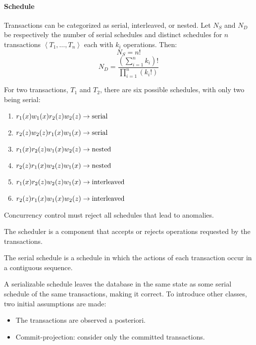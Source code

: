 \paragraph*{Schedule}
Transactions can be categorized as serial, interleaved, or nested. 
Let $N_S$ and $N_D$ be respectively the number of serial schedules and distinct schedules for $n$ transactions $\left\langle T_1,\dots,T_n\right\rangle $ each with $k_i$ operations. 
Then:
\[N_S=n!\]
\[N_D=\dfrac{\left( \sum_{i=1}^nk_i \right)!}{\prod_{i=1}^n \left( k_i! \right)}\]
\begin{example}
    For two transactions, $T_1$ and $T_2$, there are six possible schedules, with only two being serial:
    \begin{enumerate}
        \item $r_1(x) w_1(x) r_2(z) w_2(z) \rightarrow \textnormal{serial}$
        \item $r_2(z) w_2(z) r_1(x) w_1(x) \rightarrow \textnormal{serial}$
        \item $r_1(x) r_2(z) w_1(x) w_2(z) \rightarrow \textnormal{nested}$
        \item $r_2(z) r_1(x) w_2(z) w_1(x) \rightarrow \textnormal{nested}$
        \item $r_1(x) r_2(z) w_2(z) w_1(x) \rightarrow \textnormal{interleaved}$
        \item $r_2(z) r_1(x) w_1(x) w_2(z) \rightarrow \textnormal{interleaved}$
    \end{enumerate}
\end{example}
Concurrency control must reject all schedules that lead to anomalies.
\begin{definition}
    The scheduler is a component that accepts or rejects operations requested by the transactions. 
\end{definition}
\begin{definition}
    The serial schedule is a schedule in which the actions of each transaction occur in a contiguous sequence.
\end{definition}
A serializable schedule leaves the database in the same state as some serial schedule of the same transactions, making it correct. 
To introduce other classes, two initial assumptions are made:
\begin{itemize}
    \item The transactions are observed a posteriori. 
    \item Commit-projection: consider only the committed transactions. 
\end{itemize}